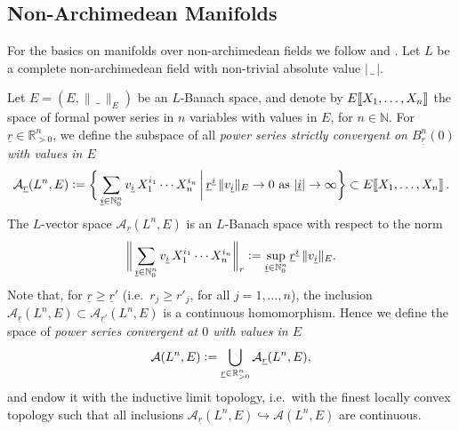 \documentclass[a4paper, reqno, 10pt]{amsart}
\theoremstyle{definition}
\numberwithin{equation}{section}
\newcommand{\abs}[1]{{\lvert{#1}\rvert}}
\newcommand{\blank}{{\,\_\,}}
\newcommand{\defeq}{\vcentcolon=}
\newcommand{\ra}{\rightarrow}
\newcommand{\ul}[1]{{\underline{#1}}}
\newcommand{\llrrbracket}[1]{\mkern-3mu\left[\mkern-2.5mu\left[#1\right]\mkern-2.5mu\right]}
\newcommand{\BN}{{\mathbb {N}}}
\newcommand{\BR}{{\mathbb {R}}}
\newcommand{\CA}{{\mathcal {A}}}
\begin{document}









\subsection{Non-Archimedean Manifolds}


For the basics on manifolds over non-archimedean fields we follow \cite[\S 4,5]{Bourbaki07VarDiffAnFasciDeResult} and \cite[Ch.\ II]{Schneider11pAdicLieGrps}.
Let $L$ be a complete non-archimedean field with non-trivial absolute value $\abs{\blank}$.


Let $E=(E,\lVert \blank\rVert_E)$ be an $L$-Banach space, and denote by $E \llrrbracket{X_1,\ldots, X_n}$ the space of formal power series in $n$ variables with values in $E$, for $n\in \BN$.
For $\ul{r}\in \BR_{>0}^n$, we define the subspace of all \textit{power series strictly convergent on $B_{\ul{r}}^{n}(0)$ with values in $E$}
\begin{equation*}
	\CA_\ul{r} (L^n,E) \defeq \bigg\{ \sum_{\ul{i}\in \BN^n_0} v_{\ul{i}} \, X_1^{i_1}\cdots X_n^{i_n} \,\bigg|\, \ul{r}^{\ul{i}} \, \lVert v_{\ul{i}} \rVert_E  \ra 0 \text{ as } \abs{\ul{i}} \ra \infty \bigg\}
	\subset E \llrrbracket{X_1,\ldots, X_n} .
\end{equation*}
The $L$-vector space $\CA_\ul{r}(L^n,E)$ is an $L$-Banach space with respect to the norm
\begin{equation*}
	\bigg\lVert \sum_{\ul{i}\in \BN^n_0} v_{\ul{i}} \, X_1^{i_1}\cdots X_n^{i_n} \bigg\rVert_r \defeq \sup_{\ul{i}\in\BN^n_0} \ul{r}^{\ul{i}} \, \lVert v_{\ul{i}} \rVert_E .
\end{equation*}
Note that, for $\ul{r}\geq \ul{r}'$ (i.e.\ $r_j \geq r'_j$, for all $j=1,\ldots,n$), the inclusion $\CA_\ul{r}(L^n,E) \subset \CA_{\ul{r}'}(L^n,E)$ is a continuous homomorphism. 
Hence we define the space of \textit{power series convergent at $0$ with values in $E$}
\begin{equation*}
	\CA(L^n, E) \defeq \bigcup_{\ul{r} \in \BR_{>0}^n} \CA_\ul{r}(L^n,E) ,
\end{equation*}
and endow it with the inductive limit topology, i.e.\ with the finest locally convex topology such that all inclusions $\CA_\ul{r}(L^n,E) \hookrightarrow \CA(L^n,E)$ are continuous.
\end{document}
